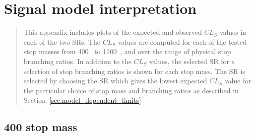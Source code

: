 \chapter[Signal model interpretation][Signal model interpretation]
        {Signal model interpretation}
\label{sec:axp_interpretation_plots}

\begin{quote}
This appendix includes plots of the expected and observed $CL_S$ values in each
of the two SRs.
The $CL_S$ values are computed for each of the tested stop masses from 400~\GeV
to 1100~\GeV, and over the range of physical stop branching ratios.
In addition to the $CL_S$ values, the selected SR for a selection of stop
branching ratios is shown for each stop mass.
The SR is selected by choosing the SR which gives the lowest expected $CL_S$
value for the particular choice of stop mass and branching ratios as described
in Section~\ref{sec:model_dependent_limits}
\end{quote}

\newpage
\section{400 \texorpdfstring{\GeV}{GeV} stop mass}

